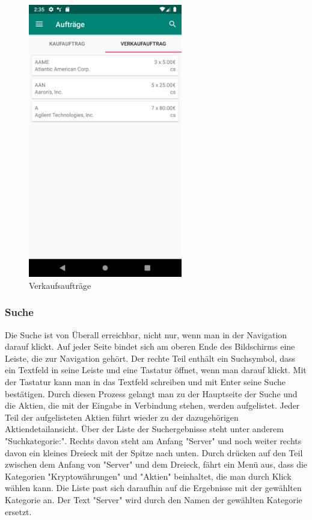 \documentclass[10pt]{scrartcl}
\begin{document}
\begin{figure}[H]
	\centering
	\includegraphics[width=0.6\textwidth]{Bilder/Applikation/Verkaufauftrag.png}
	\caption{Verkaufsaufträge}
\end{figure}

\subsubsection{Suche}
Die Suche ist von Überall erreichbar, nicht nur, wenn man in der Navigation darauf klickt. Auf jeder Seite bindet sich am oberen Ende des Bildschirms eine Leiste, die zur Navigation gehört. Der rechte Teil enthält ein Suchsymbol, dass ein Textfeld in seine Leiste und eine Tastatur öffnet, wenn man darauf klickt. Mit der Tastatur kann man in das Textfeld schreiben und mit Enter seine Suche bestätigen. Durch diesen Prozess gelangt man zu der Hauptseite der Suche und die Aktien, die mit der Eingabe in Verbindung stehen, werden aufgelistet. Jeder Teil der aufgelisteten Aktien führt wieder zu der dazugehörigen Aktiendetailansicht. Über der Liste der Suchergebnisse steht unter anderem "Suchkategorie:". Rechts davon steht am Anfang "Server" und noch weiter rechts davon ein kleines Dreieck mit der Spitze nach unten. Durch drücken auf den Teil zwischen dem Anfang von "Server" und dem Dreieck, fährt ein Menü aus, dass die Kategorien "Kryptowährungen" und "Aktien" beinhaltet, die man durch Klick wählen kann. Die Liste past sich daraufhin auf die Ergebnisse mit der gewählten Kategorie an. Der Text "Server" wird durch den Namen der gewählten Kategorie ersetzt.
\end{document}
